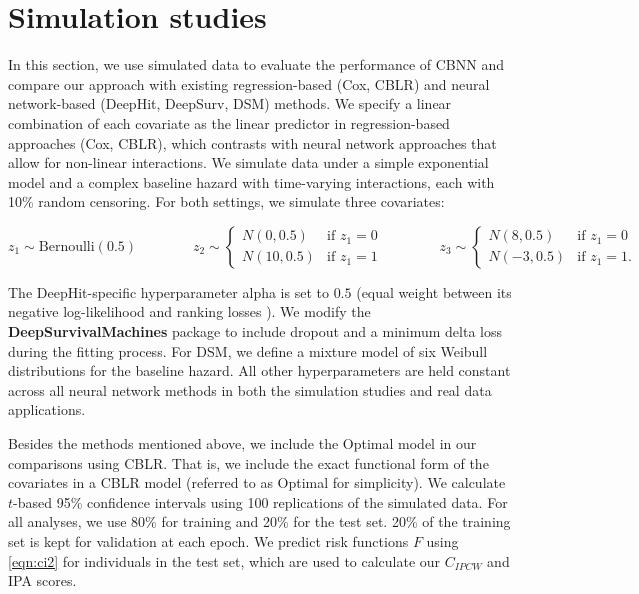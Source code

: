 \documentclass[AMA,STIX1COL,]{WileyNJD-v2}
\begin{document}
\hypertarget{sims}{%
\section{Simulation studies}\label{sims}}

In this section, we use simulated data to evaluate the performance of
CBNN and compare our approach with existing regression-based (Cox, CBLR)
and neural network-based (DeepHit, DeepSurv, DSM) methods. We specify a
linear combination of each covariate as the linear predictor in
regression-based approaches (Cox, CBLR), which contrasts with neural
network approaches that allow for non-linear interactions. We simulate
data under a simple exponential model and a complex baseline hazard with
time-varying interactions, each with 10\% random censoring. For both
settings, we simulate three covariates:

\[
z_{1} \sim \textrm{Bernoulli}(0.5) \qquad \qquad
z_{2} \sim \begin{cases}
 N(0,0.5) & \textrm{if } z_{1}=0\\ 
 N(10,0.5) & \textrm{if } z_{1}=1
\end{cases} \qquad \qquad
z_{3} \sim \begin{cases}
 N(8,0.5) & \textrm{if } z_{1}=0\\ 
 N(-3,0.5) & \textrm{if } z_{1}=1.
\end{cases}
\]

The DeepHit-specific hyperparameter alpha is set to \(0.5\) (equal
weight between its negative log-likelihood and ranking losses
\citep{lee2018DeepHit}). We modify the \textbf{DeepSurvivalMachines}
\citep{dsmPaper} package to include dropout and a minimum delta loss
during the fitting process. For DSM, we define a mixture model of six
Weibull distributions for the baseline hazard. All other hyperparameters
are held constant across all neural network methods in both the
simulation studies and real data applications.

Besides the methods mentioned above, we include the Optimal model in our
comparisons using CBLR. That is, we include the exact functional form of
the covariates in a CBLR model (referred to as Optimal for simplicity).
We calculate \(t\)-based 95\% confidence intervals using 100
replications of the simulated data. For all analyses, we use 80\% for
training and 20\% for the test set. 20\% of the training set is kept for
validation at each epoch. We predict risk functions \(F\) using
\eqref{eqn:ci2} for individuals in the test set, which are used to
calculate our \(C_{IPCW}\) and IPA scores.
\end{document}
